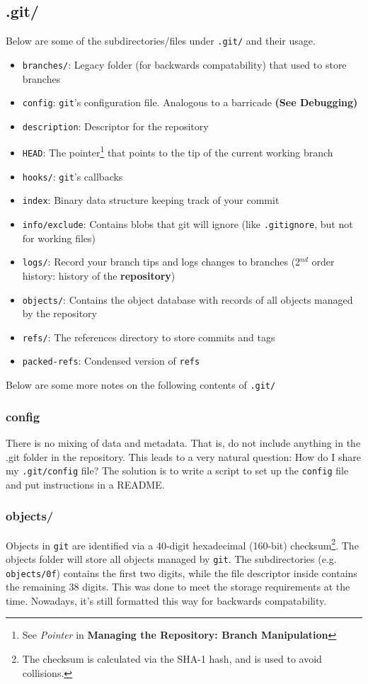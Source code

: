 \documentclass[13pt]{article}
\begin{document}
\subsection{.git/}
Below are some of the subdirectories/files under \texttt{.git/} and their usage.
\begin{itemize}[label=\texttt{.git/}]
\item \texttt{branches/}: Legacy folder (for backwards compatability) that used to store branches
\item \texttt{config}: \texttt{git}'s configuration file. Analogous to a barricade \textbf{(See Debugging)}
\item \texttt{description}: Descriptor for the repository
\item \texttt{HEAD}: The pointer\footnote{See \textit{Pointer} in \textbf{Managing the Repository: Branch Manipulation}} that points to the tip of the current working branch
\item \texttt{hooks/}: \texttt{git}'s callbacks
\item \texttt{index}: Binary data structure keeping track of your commit
\item \texttt{info/exclude}: Contains blobs that git will ignore (like \texttt{.gitignore}, but not for working files)
\item \texttt{logs/}: Record your branch tips and logs changes to branches (2$^{nd}$ order history: history of the \textbf{repository})
\item \texttt{objects/}: Contains the object database with records of all objects managed by the repository
\item \texttt{refs/}: The references directory to store commits and tags
\item \texttt{packed-refs}: Condensed version of \texttt{refs}
\end{itemize}
Below are some more notes on the following contents of \texttt{.git/}

\subsubsection*{config}
There is no mixing of data and metadata. That is, do not include anything in the .git folder in the repository. This leads to a very natural question: How do I share my \texttt{.git/config} file? The solution is to write a script to set up the \texttt{config} file and put instructions in a README.

\subsubsection*{objects/}
Objects in \texttt{git} are identified via a 40-digit hexadecimal (160-bit) checksum\footnote{The checksum is calculated via the SHA-1 hash, and is used to avoid collisions.}. The objects folder will store all objects managed by \texttt{git}. The subdirectories (e.g. \texttt{objects/0f}) contains the first two digits, while the file descriptor inside contains the remaining 38 digits. This was done to meet the storage requirements at the time. Nowadays, it's still formatted this way for backwards compatability.
\end{document}
